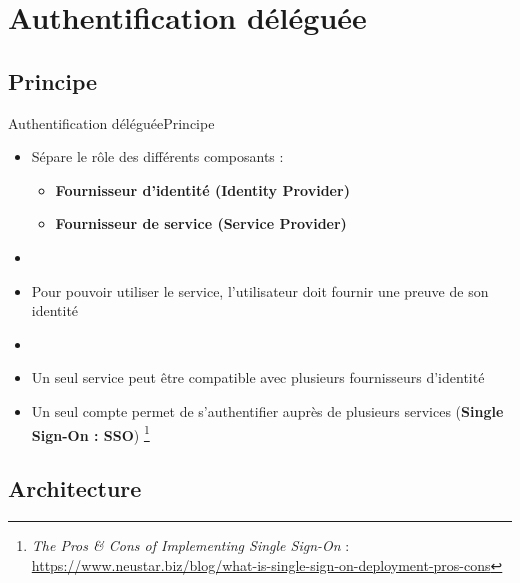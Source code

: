 \documentclass{beamer}
\begin{document}
\section{Authentification déléguée}

\subsection{Principe}

\begin{frame}{Authentification déléguée}{Principe}
  \begin{center}
    \begin{itemize}
      \item Sépare le rôle des différents composants :
      \begin{itemize}
        \item \textbf{Fournisseur d'identité (Identity Provider)}
        \item \textbf{Fournisseur de service (Service Provider)}
      \end{itemize}
      \item[~]
      \item Pour pouvoir utiliser le service, l'utilisateur doit fournir une preuve de son identité
      \item[~]
      \item Un seul service peut être compatible avec plusieurs fournisseurs d'identité
      \item {
        Un seul compte permet de s'authentifier auprès de plusieurs services (\textbf{Single Sign-On : SSO})
        \footnote[frame]{
          \emph{The Pros \& Cons of Implementing Single Sign-On} :
          \url{https://www.neustar.biz/blog/what-is-single-sign-on-deployment-pros-cons}
        }
      }
    \end{itemize}
  \end{center}
\end{frame}

\subsection{Architecture}
\end{document}
